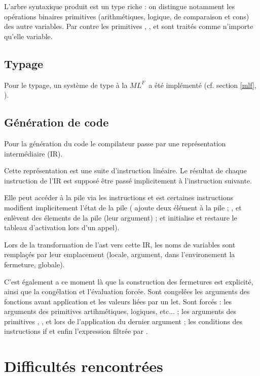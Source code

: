 \documentclass[a4paper]{article}
\def\mlf{$ML^F$}
\begin{document}
L'arbre syntaxique produit est un type riche : on distingue notamment
les opérations binaires primitives (arithmétiques, logique, de
comparaison et cons) des autre variables. Par contre les primitives
, ,  et  sont
traités comme n'importe qu'elle variable.

\subsection{Typage}
Pour le typage, un système de type \og à la \mlf \fg ~a été implémenté
(cf. section \ref{mlf}, ). %

\subsection{Génération de code}
Pour la génération du code le compilateur passe par une représentation
intermédiaire (IR).

Cette représentation est une suite d'instruction linéaire. Le résultat
de chaque instruction de l'IR est supposé être passé implicitement à
l'instruction suivante.

Elle peut accéder à la pile via les instructions  et
 est certaines instructions modifient implicitement l'état
de la pile ( ajoute deux élément à la pile ;
,  et  enlèvent des
élements de la pile (leur argument) ;  et
 initialise et restaure le tableau d'activation lors
d'un appel).

Lors de la transformation de l'ast vers cette IR, les noms de
variables sont remplaçés par leur emplacement (locale, argument, dans
l'environement la fermeture, globale).

C'est également a ce moment là que la construction des fermetures est
explicité, ainsi que la congélation et l'évaluation forcée. Sont
congelées les arguments des fonctions avant application et les valeurs
liées par un let. Sont forcés : les arguments des primitives
artihmétiques, logiques, etc... ; les arguments des primitives
, ,  et  lors de
l'application du dernier argument ; les conditions des instructions if
et enfin l'expression filtrée par .


\section{Difficultés rencontrées}
\end{document}
